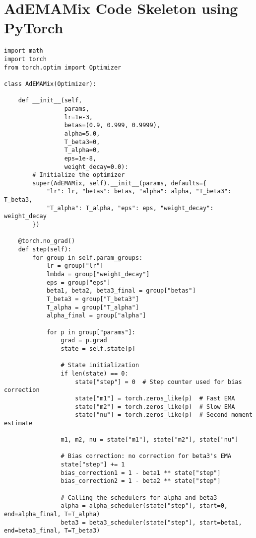 \documentclass{article}
\begin{document}
\section*{AdEMAMix Code Skeleton using PyTorch}

\begin{lstlisting}
import math
import torch
from torch.optim import Optimizer

class AdEMAMix(Optimizer):

    def __init__(self,
                 params,
                 lr=1e-3,
                 betas=(0.9, 0.999, 0.9999),
                 alpha=5.0,
                 T_beta3=0,
                 T_alpha=0,
                 eps=1e-8,
                 weight_decay=0.0):
        # Initialize the optimizer
        super(AdEMAMix, self).__init__(params, defaults={
            "lr": lr, "betas": betas, "alpha": alpha, "T_beta3": T_beta3,
            "T_alpha": T_alpha, "eps": eps, "weight_decay": weight_decay
        })

    @torch.no_grad()
    def step(self):
        for group in self.param_groups:
            lr = group["lr"]
            lmbda = group["weight_decay"]
            eps = group["eps"]
            beta1, beta2, beta3_final = group["betas"]
            T_beta3 = group["T_beta3"]
            T_alpha = group["T_alpha"]
            alpha_final = group["alpha"]

            for p in group["params"]:
                grad = p.grad
                state = self.state[p]

                # State initialization
                if len(state) == 0:
                    state["step"] = 0  # Step counter used for bias correction
                    state["m1"] = torch.zeros_like(p)  # Fast EMA
                    state["m2"] = torch.zeros_like(p)  # Slow EMA
                    state["nu"] = torch.zeros_like(p)  # Second moment estimate

                m1, m2, nu = state["m1"], state["m2"], state["nu"]

                # Bias correction: no correction for beta3's EMA
                state["step"] += 1
                bias_correction1 = 1 - beta1 ** state["step"]
                bias_correction2 = 1 - beta2 ** state["step"]

                # Calling the schedulers for alpha and beta3
                alpha = alpha_scheduler(state["step"], start=0, end=alpha_final, T=T_alpha)
                beta3 = beta3_scheduler(state["step"], start=beta1, end=beta3_final, T=T_beta3)


\end{lstlisting}
\end{document}
